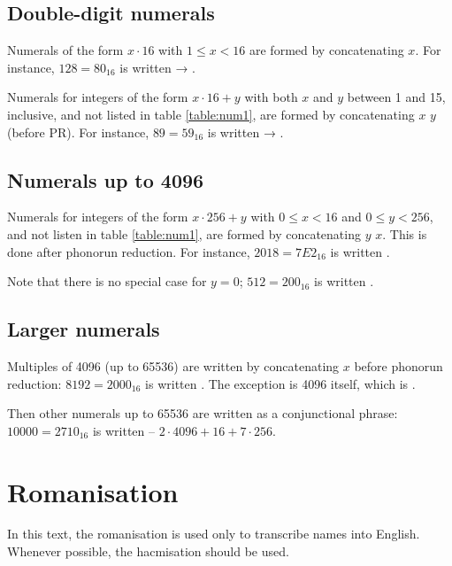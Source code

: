 \documentclass{book}
\begin{document}
\section{Double-digit numerals}

Numerals of the form $x \cdot 16$ with $1 \le x < 16$ are formed by concatenating  $x$. For instance, $128 = 80_{16}$ is written  → .

Numerals for integers of the form $x \cdot 16 + y$ with both $x$ and $y$ between 1 and 15, inclusive, and not listed in table \ref{table:num1}, are formed by concatenating $x$  $y$  (before PR). For instance, $89 = 59_{16}$ is written  → .

\section{Numerals up to 4096}

Numerals for integers of the form $x \cdot 256 + y$ with $0 \le x < 16$ and $0 \le y < 256$, and not listen in table \ref{table:num1}, are formed by concatenating $y$  $x$. This is done after phonorun reduction. For instance, $2018 = 7E2_{16}$ is written .

Note that there is no special case for $y = 0$; $512 = 200_{16}$ is written .

\section{Larger numerals}

Multiples of 4096 (up to 65536) are written by concatenating  $x$ before phonorun reduction: $8192 = 2000_{16}$ is written . The exception is 4096 itself, which is .

Then other numerals up to 65536 are written as a conjunctional phrase: $10000 = 2710_{16}$ is written  -- $2 \cdot 4096 + 16 + 7 \cdot 256$.

\appendix

\chapter*{Romanisation}

In this text, the romanisation is used only to transcribe names into English. Whenever possible, the hacmisation should be used.
\end{document}
